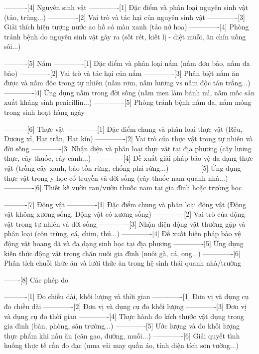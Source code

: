 ----------[4] Nguyên sinh vật
-------------[1] Đặc điểm và phân loại nguyên sinh vật (tảo, trùng...)
-------------[2] Vai trò và tác hại của nguyên sinh vật
-------------[3] Giải thích hiện tượng nước ao hồ có màu xanh (tảo nở hoa)
-------------[4] Phòng tránh bệnh do nguyên sinh vật gây ra (sốt rét, kiết lị - diệt muỗi, ăn chín uống sôi...)

----------[5] Nấm
-------------[1] Đặc điểm và phân loại nấm (nấm đơn bào, nấm đa bào)
-------------[2] Vai trò và tác hại của nấm
-------------[3] Phân biệt nấm ăn được và nấm độc trong tự nhiên (nấm rơm, nấm hương vs nấm độc tán trắng...)
-------------[4] Ứng dụng nấm trong đời sống (nấm men làm bánh mì, nấm mốc sản xuất kháng sinh penicillin...)
-------------[5] Phòng tránh bệnh nấm da, nấm móng trong sinh hoạt hàng ngày

----------[6] Thực vật
-------------[1] Đặc điểm chung và phân loại thực vật (Rêu, Dương xỉ, Hạt trần, Hạt kín)
-------------[2] Vai trò của thực vật trong tự nhiên và đời sống
-------------[3] Nhận diện và phân loại thực vật tại địa phương (cây lương thực, cây thuốc, cây cảnh...)
-------------[4] Đề xuất giải pháp bảo vệ đa dạng thực vật (trồng cây xanh, bảo tồn rừng, chống phá rừng...)
-------------[5] Ứng dụng thực vật trong y học cổ truyền và đời sống (cây thuốc nam quanh nhà...)
-------------[6] Thiết kế vườn rau/vườn thuốc nam tại gia đình hoặc trường học

----------[7] Động vật
-------------[1] Đặc điểm chung và phân loại động vật (Động vật không xương sống, Động vật có xương sống)
-------------[2] Vai trò của động vật trong tự nhiên và đời sống
-------------[3] Nhận diện động vật thường gặp và phân loại (côn trùng, cá, chim, thú...)
-------------[4] Đề xuất biện pháp bảo vệ động vật hoang dã và đa dạng sinh học tại địa phương
-------------[5] Ứng dụng kiến thức động vật trong chăn nuôi gia đình (nuôi gà, cá, ong...)
-------------[6] Phân tích chuỗi thức ăn và lưới thức ăn trong hệ sinh thái quanh nhà/trường

-------[8] Các phép đo

----------[1] Đo chiều dài, khối lượng và thời gian
-------------[1] Đơn vị và dụng cụ đo chiều dài
-------------[2] Đơn vị và dụng cụ đo khối lượng
-------------[3] Đơn vị và dụng cụ đo thời gian
-------------[4] Thực hành đo kích thước vật dụng trong gia đình (bàn, phòng, sân trường...)
-------------[5] Ước lượng và đo khối lượng thực phẩm khi nấu ăn (cân gạo, đường, muối...)
-------------[6] Giải quyết tình huống thực tế cần đo đạc (mua vải may quần áo, tính diện tích sơn tường...)

